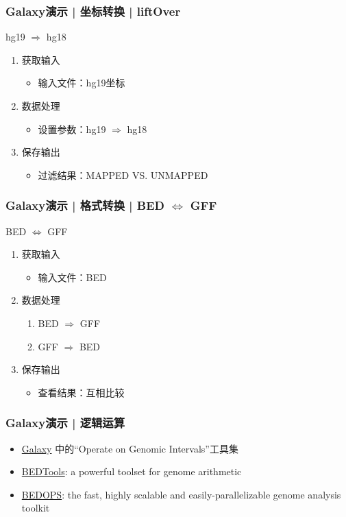 \begin{frame}
  \frametitle{Galaxy演示 | 坐标转换 | liftOver}
  \begin{block}{hg19 $\Rightarrow$ hg18}
    \pause
  \begin{enumerate}[<+-|alert@+>]
    \item 获取输入
      \begin{itemize}
        \item 输入文件：hg19坐标
      \end{itemize}
    \item 数据处理
      \begin{itemize}
        \item 设置参数：hg19 $\Rightarrow$ hg18
      \end{itemize}
    \item 保存输出
      \begin{itemize}
        \item 过滤结果：MAPPED VS. UNMAPPED
      \end{itemize}
  \end{enumerate}
\end{block}
\end{frame}

\begin{frame}
  \frametitle{Galaxy演示 | 格式转换 | BED $\Leftrightarrow$ GFF}
  \begin{block}{BED $\Leftrightarrow$ GFF}
    \pause
  \begin{enumerate}[<+-|alert@+>]
    \item 获取输入
      \begin{itemize}
        \item 输入文件：BED
      \end{itemize}
    \item 数据处理
      \begin{enumerate}
        \item BED $\Rightarrow$ GFF
        \item GFF $\Rightarrow$ BED
      \end{enumerate}
    \item 保存输出
      \begin{itemize}
        \item 查看结果：互相比较
      \end{itemize}
  \end{enumerate}
\end{block}
\end{frame}

\begin{frame}
  \frametitle{Galaxy演示 | \alert{逻辑运算}}
  \begin{itemize}
    \item \href{https://usegalaxy.org/}{Galaxy} 中的“Operate on Genomic Intervals”工具集
    \item \href{http://bedtools.readthedocs.org/en/latest/}{BEDTools}: a powerful toolset for genome arithmetic
    \item \href{https://bedops.readthedocs.org/en/latest/}{BEDOPS}: the fast, highly scalable and easily-parallelizable genome analysis toolkit
  \end{itemize}
\end{frame}


